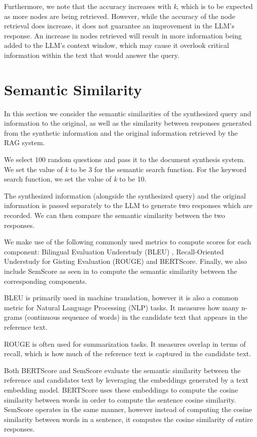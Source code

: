 Furthermore, we note that the accuracy increases with \textit{k}, which is to be expected as more nodes are being retrieved. However, while the accuracy of the node retrieval does increase, it does not guarantee an improvement in the LLM's response. An increase in nodes retrieved will result in more information being added to the LLM's context window, which may cause it overlook critical information within the text that would answer the query.

\section{Semantic Similarity}

In this section we consider the semantic similarities of the synthesized query and information to the original, as well as the similarity between responses generated from the synthetic information and the original information retrieved by the RAG system.

We select 100 random questions and pass it to the document synthesis system. We set the value of \textit{k} to be 3 for the semantic search function. For the keyword search function, we set the value of \textit{k} to be 10.

The synthesized information (alongside the synthesized query) and the original information is passed separately to the LLM to generate two responses which are recorded. We can then compare the semantic similarity between the two responses.

We make use of the following commonly used metrics to compute scores for each component: Bilingual Evaluation Understudy (BLEU) , Recall-Oriented Understudy for Gisting Evaluation (ROUGE) and BERTScore. Finally, we also include SemScore as seen in \autocite{aynetdinov2024semscoreautomatedevaluationinstructiontuned} to compute the semantic similarity between the corresponding components.

BLEU is primarily used in machine translation, however it is also a common metric for Natural Language Processing (NLP) tasks. It measures how many n-grams (continuous sequence of words) in the candidate text that appears in the reference text.

ROUGE is often used for summarization tasks. It measures overlap in terms of recall, which is how much of the reference text is captured in the candidate text.

Both BERTScore and SemScore evaluate the semantic similarity between the reference and candidates text by leveraging the embeddings generated by a text embedding model. BERTScore uses these embeddings to compute the cosine similarity between words in order to compute the sentence cosine similarity. SemScore operates in the same manner, however instead of computing the cosine similarity between words in a sentence, it computes the cosine similarity of entire responses.

